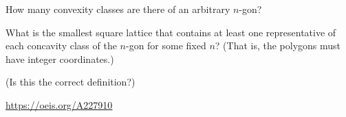\documentclass{article}
\begin{document}
\begin{question}
  How many convexity classes are there of an arbitrary $n$-gon?
\end{question}

\begin{related}
  \item What is the smallest square lattice that contains at least one
    representative of each concavity class of the $n$-gon for some fixed $n$?
    (That is, the polygons must have integer coordinates.)
  \item (Is this the correct definition?)
\end{related}
\begin{references}
  \item \url{https://oeis.org/A227910}
\end{references}
\end{document}
